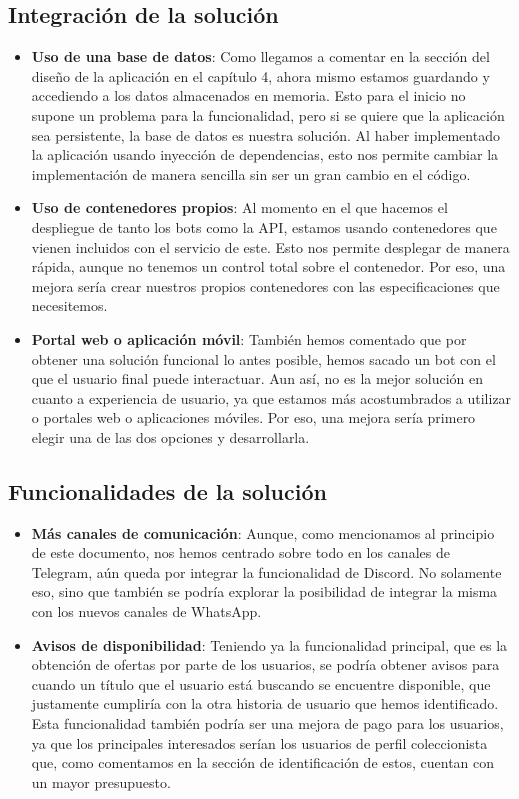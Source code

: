 \subsection{Integración de la solución}
\begin{itemize}
    \item \textbf{Uso de una base de datos}: Como llegamos a comentar en la sección 
    del diseño de la aplicación en el capítulo 4, ahora mismo estamos guardando y 
    accediendo a los datos almacenados en memoria. Esto para el inicio no supone un 
    problema para la funcionalidad, pero si se quiere que la aplicación sea 
    persistente, la base de datos es nuestra solución. Al haber implementado la 
    aplicación usando inyección de dependencias, esto nos permite cambiar la 
    implementación de manera sencilla sin ser un gran cambio en el código.
    \item \textbf{Uso de contenedores propios}: Al momento en el que hacemos el 
    despliegue de tanto los bots como la API, estamos usando contenedores que 
    vienen incluidos con el servicio de este. Esto nos permite desplegar de manera 
    rápida, aunque no tenemos un control total sobre el contenedor. Por eso, una 
    mejora sería crear nuestros propios contenedores con las especificaciones que 
    necesitemos.
    \item \textbf{Portal web o aplicación móvil}: También hemos comentado que por 
    obtener una solución funcional lo antes posible, hemos sacado un bot con el que 
    el usuario final puede interactuar. Aun así, no es la mejor solución en cuanto 
    a experiencia de usuario, ya que estamos más acostumbrados a utilizar o 
    portales web o aplicaciones móviles. Por eso, una mejora sería primero elegir 
    una de las dos opciones y desarrollarla.
\end{itemize}

\subsection{Funcionalidades de la solución}
\begin{itemize}
    \item \textbf{Más canales de comunicación}: Aunque, como mencionamos al 
    principio de este documento, nos hemos centrado sobre todo en los canales de 
    Telegram, aún queda por integrar la funcionalidad de Discord. No solamente eso, 
    sino que también se podría explorar la posibilidad de integrar la misma con 
    los nuevos canales de WhatsApp.
    \item \textbf{Avisos de disponibilidad}: Teniendo ya la funcionalidad 
    principal, que es la obtención de ofertas por parte de los usuarios, se podría 
    obtener avisos para cuando un título que el usuario está buscando se encuentre 
    disponible, que justamente cumpliría con la otra historia de usuario que hemos 
    identificado. Esta funcionalidad también podría ser una mejora de pago para los 
    usuarios, ya que los principales interesados serían los usuarios de perfil 
    coleccionista que, como comentamos en la sección de identificación de estos, 
    cuentan con un mayor presupuesto.
\end{itemize}